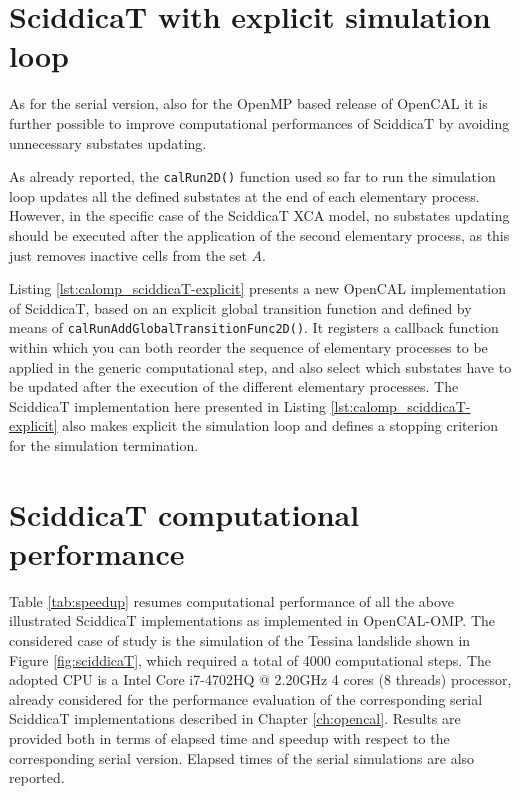 \section{SciddicaT with explicit simulation loop}

As for the serial version, also for the OpenMP based release of
OpenCAL it is further possible to improve computational performances of
SciddicaT by avoiding unnecessary substates updating.

As already reported, the \verb'calRun2D()' function used so far to
run the simulation loop updates all the defined substates at the end
of each elementary process. However, in the specific case of the
SciddicaT XCA model, no substates updating should be executed after
the application of the second elementary process, as this just removes
inactive cells from the set $A$.

Listing \ref{lst:calomp_sciddicaT-explicit} presents a new OpenCAL implementation of SciddicaT, based on an explicit global
transition function and defined by means of
\verb'calRunAddGlobalTransitionFunc2D()'. It registers a callback
function within which you can both reorder the sequence of elementary
processes to be applied in the generic computational step, and also
select which substates have to be updated after the execution of the
different elementary processes. The SciddicaT implementation here
presented in Listing \ref{lst:calomp_sciddicaT-explicit} also
makes explicit the simulation loop and defines a stopping criterion for
the simulation termination.




\section{SciddicaT computational performance}

Table \ref{tab:speedup} resumes computational performance of all the
above illustrated SciddicaT implementations as implemented in
OpenCAL-OMP. The considered case of study is the simulation of the
Tessina landslide shown in Figure \ref{fig:sciddicaT}, which required
a total of 4000 computational steps. The adopted CPU is a Intel Core
i7-4702HQ @ 2.20GHz 4 cores (8 threads) processor, already considered
for the performance evaluation of the corresponding serial SciddicaT
implementations described in Chapter \ref{ch:opencal}. Results are
provided both in terms of elapsed time and speedup with respect to
the corresponding serial version. Elapsed times of the serial
simulations are also reported.

